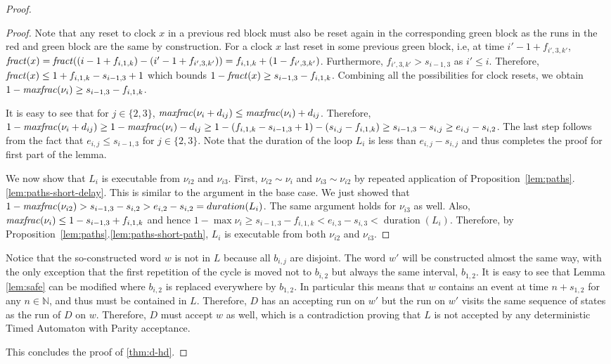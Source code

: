 \documentclass[10pt,a4paper]{amsart}
\theoremstyle{definition}
\numberwithin{equation}{section}
\newcommand{\N}{\mathbb{N}}
\newcommand{\fractof}[1]{{\it fract}(#1)} %
\newcommand{\maxfractof}[1]{{\it maxfrac}(#1)}
\newcommand{\dur}[1]{\mathop{duration}(#1)}
\newcommand{\req}{\sim}
\newcommand{\block}[2]{b_{#1,#2}}
\newcommand{\bstart}[2]{s_{#1,#2}}
\newcommand{\bend}[2]{e_{#1,#2}}
\newcommand{\tick}[3]{f_{#1,#2,#3}}
\begin{document}
\begin{proof}
\begin{proof}
	Note that any reset to clock $x$ in a previous red block must also be reset again in the corresponding green block as the runs in the red and green block are the same by construction. 
	For a clock $x$ last reset in some previous green block, i.e, at time $i'-1+ \tick{i'}{3}{k'}$, $\fractof{x}=\fractof{(i-1+ \tick{i}{1}{k}) - (i'-1 +\tick{i'}{3}{k'})}
	= 
	\tick{i}{1}{k}+(1- \tick{i'}{3}{k'})$.
	Furthermore, $\tick{i'}{3}{k'}>\bstart{i-1}{3}$ as $i'\leq i$. Therefore, $\fractof{x}\leq 1+\tick{i}{1}{k}-\bstart{i-1}{3}+1$ which bounds $1-\fractof{x}\geq \bstart{i-1}{3}-\tick{i}{1}{k}$.
	Combining all the possibilities for clock resets, we obtain $1-\maxfractof{\nu_i}\geq \bstart{i-1}{3}-\tick{i}{1}{k}$.
	
	
	It is easy to see that for $j\in \{2,3\}$, $\maxfractof{\nu_i+d_{ij}}\leq \maxfractof{\nu_i}+d_{ij}$. Therefore, $1-\maxfractof{\nu_i+d_{ij}}\geq 1-\maxfractof{\nu_i} - d_{ij}\geq 1- (\tick{i}{1}{k}-\bstart{i-1}{3}+1) - (\bstart{i}{j}- \tick{i}{1}{k})\geq \bstart{i-1}{3} - \bstart{i}{j}\geq \bend{i}{j}-\bstart{i}{2}$. The last step follows from the fact that $\bend{i}{j}\leq \bstart{i-1}{3}$ for $j\in\{2,3\}$. Note that the duration of the loop $L_i$ is less than $\bend{i}{j}-\bstart{i}{j}$ and thus completes the proof for first part of the lemma.

    We now show that $L_i$ is executable from $\nu_{i2}$ and $\nu_{i3}$. 	First, $\nu_{i2}\req \nu_i$ and $\nu_{i3}\req \nu_{i2}$ by repeated application of Proposition~\ref{lem:paths}.\ref{lem:paths-short-delay}. This is similar to the argument in the base case.
	We just showed that $1-\maxfractof{\nu_{i2}}> \bstart{i-1}{3}-\bstart{i}{2}> \bend{i}{2}-\bstart{i}{2}= \dur{L_i}$. The same argument holds for $\nu_{i3}$ as well. Also, $\maxfractof{\nu_{i}} \leq 1- \bstart{i-1}{3} + \tick{i}{1}{k}$ and hence $1-\max\nu_{i}\geq  \bstart{i-1}{3}-\tick{i}{1}{k}<\bend{i}{3}-\bstart{i}{3}<\dur{L_i}$.
    Therefore, by Proposition~\ref{lem:paths}.\ref{lem:paths-short-path}, $L_i$ is executable from both $\nu_{i2}$ and $\nu_{i3}$. 
\end{proof}


Notice that the so-constructed word $w$ is not in $L$ because all $\block{i}{j}$ are disjoint.
The word $w'$ will be constructed almost the same way, with the only exception that
the first repetition of the cycle is moved not to $\block{i}{2}$
but always the same interval, $\block{1}{2}$. 
It is easy to see that Lemma \ref{lem:safe} can be modified where $\block{i}{2}$ is replaced everywhere by $\block{1}{2}$. 
In particular this means that
$w$ contains an event at time $n+\bstart{1}{2}$ for any $n\in\N$, and thus must be contained in $L$.
Therefore, $D$ has an accepting run on $w'$ but the run on $w'$ visits the same sequence of states as the run of $D$ on $w$. Therefore, $D$ must accept $w$ as well, which is a contradiction proving that $L$ is not accepted by any deterministic Timed Automaton with Parity acceptance.

This concludes the proof of \cref{thm:d-hd}.
\end{proof}
\end{document}
